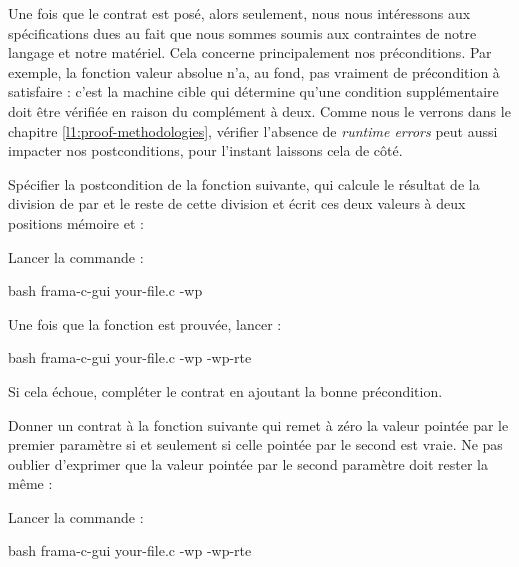 Une fois que le contrat est posé, alors seulement, nous nous intéressons aux
spécifications dues au fait que nous sommes soumis aux contraintes de notre langage
et notre matériel. Cela concerne principalement nos préconditions. Par exemple,
la fonction valeur absolue n'a, au fond, pas  vraiment de précondition à
satisfaire : c'est la machine cible qui détermine qu'une condition supplémentaire
doit être vérifiée en raison du complément à deux. Comme nous le verrons dans le
chapitre \ref{l1:proof-methodologies}, vérifier l'absence de {\em runtime errors}
peut aussi impacter nos postconditions, pour l'instant laissons cela de côté.






Spécifier la postcondition de la fonction suivante, qui calcule le résultat
de la division de  par  et le reste de cette
division et écrit ces deux valeurs à deux positions mémoire 
et  :




Lancer la commande :


\begin{CodeBlock}{bash}
frama-c-gui your-file.c -wp
\end{CodeBlock}


Une fois que la fonction est prouvée, lancer :

\begin{CodeBlock}{bash}
frama-c-gui your-file.c -wp -wp-rte
\end{CodeBlock}


Si cela échoue, compléter le contrat en ajoutant la bonne précondition.




Donner un contrat à la fonction suivante qui remet à zéro la valeur
pointée par le premier paramètre si et seulement si celle pointée par le
second est vraie. Ne pas oublier d'exprimer que la valeur pointée par le second
paramètre doit rester la même :




Lancer la commande :


\begin{CodeBlock}{bash}
frama-c-gui your-file.c -wp -wp-rte
\end{CodeBlock}





